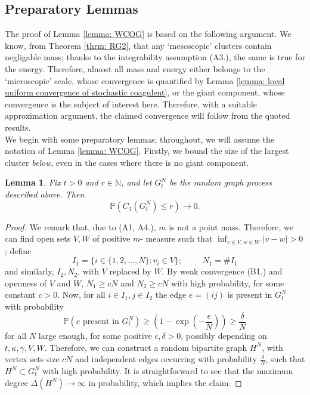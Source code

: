 \documentclass[11pt, notitlepage]{article}
\newtheorem{lem}[thm]{Lemma}
\begin{document}
\subsection{\textbf{Preparatory Lemmas}} The proof of Lemma \ref{lemma: WCOG} is based on the following argument. We know, from Theorem \ref{thrm: RG2}, that any `mesoscopic' clusters contain negligable mass; thanks to the integrability assumption (A3.), the same is true for the energy. Therefore, almost all mass and energy either belongs to the `microscopic' scale, whose convergence is quantified by Lemma \ref{lemma: local uniform convergence of stochastic coagulent}, or the giant component, whose convergence is the subject of interest here. Therefore, with a suitable approximation argument, the claimed convergence will follow from the quoted results.  \medskip\\ We begin with some preparatory lemmas; throughout, we will assume the notation of Lemma \ref{lemma: WCOG}. Firstly, we  bound the size of the largest cluster \emph{below}, even in the cases where there is no giant component. 
\begin{lem}\label{lemma: lower bound on largest cluster} Fix $t>0$ and $r\in \mathbb{N}$, and let $G^N_t$ be the random graph process described above. Then \begin{equation}
    \mathbb{P}(C_1(G^N_t)\leq r)\rightarrow 0.
\end{equation} \end{lem}
\begin{proof} We remark that, due to (A1, A4.), $m$ is not a point mass. Therefore, we can find open sets $V, W$ of positive $m$- measure such that $\inf_{v \in V, w \in W} |v-w|>0$; define \begin{equation} I_1=\{i \in \{1,2,...,N\}: v_i \in V\}; \hspace{1cm} N_1=\#I_1
\end{equation} and similarly, $I_2, N_2$, with $V$ replaced by $W$. By weak convergence (B1.) and openness of $V$ and $W$, $N_1\geq cN$ and $N_2\geq cN$ with high probability, for some constant $c>0$. Now, for all $i\in I_1, j\in I_2$ the edge $e=(ij)$ is present in $G^N_t$ with probability \begin{equation}
    \mathbb{P}(e \text{ present in }G^N_t) \geq \left(1-\exp\left(-\frac{\epsilon}{N}\right)\right) \geq \frac{\delta}{N}
\end{equation} for all $N$ large enough, for some positive $\epsilon, \delta>0$, possibly depending on $t,\kappa,\gamma, V,W$. Therefore, we can construct a random bipartite graph $H^N$, with vertex sets size $cN$ and independent edges occurring with probability $\frac{\delta}{N}$, such that $H^N \subset G^N_t$ with high probability. It is straightforward to see that the maximum degree $\Delta(H^N)\rightarrow \infty$ in probability, which implies the claim.  \end{proof}
\end{document}

